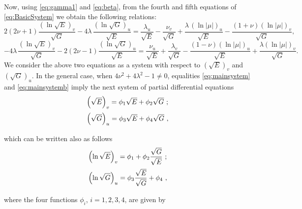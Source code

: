 \documentclass[12pt]{amsart}
\theoremstyle{definition}
\theoremstyle{remark}
\newcommand{\ds}{\displaystyle}
\numberwithin{equation}{section}
\begin{document}
Now, using  \eqref{eq:gamma1} and  \eqref{eq:beta}, from the fourth and fifth equations of \eqref{eq:BasicSystem} we obtain  the following relations:
\begin{equation}\label{eq:mainsystem}
\ds 2(2\nu+1) \frac{(\ln \sqrt{ E})_v}{\sqrt{G}}	-4\lambda\, \frac{(\ln \sqrt{ G})_u}{\sqrt{E}}  =
	\displaystyle{\frac{\lambda_u}{\sqrt{E}}  - \frac{\nu_v}{\sqrt{G}} + \frac{\lambda\, (\ln |\mu|)_u}{\sqrt E}  - \frac{(1+\nu)(\ln |\mu|)_v}{\sqrt G}},
\end{equation}
\begin{equation}\label{eq:mainsystemb}
		\ds	-4\lambda\, \frac{(\ln \sqrt{E})_v}{\sqrt{G}} - 2(2\nu-1) \frac{(\ln \sqrt{G})_u}{\sqrt{E}}  =
		\displaystyle{\frac{\nu_u}{\sqrt{E}} + \frac{\lambda_v}{\sqrt{G}}  - \frac{(1-\nu)(\ln |\mu|)_u}{\sqrt E}  + \frac{\lambda (\ln |\mu|)_v}{\sqrt G}}.
\end{equation}
We consider the above two equations as a system with respect to $(\sqrt E)_v$ and $(\sqrt G)_u$. In the general case, when $4\nu^2+4\lambda^2-1\ne0$, 
equalities  \eqref{eq:mainsystem} and \eqref{eq:mainsystemb} imply the next system of partial differential equations 
\begin{equation*} %
	\begin{array}{l}
		\vspace{2mm}
		\left(\sqrt E\right)_v=\phi_1\sqrt E+\phi_2\sqrt G \ ; \\
		\vspace{2mm}
		\left(\sqrt G\right)_u=\phi_3\sqrt E+\phi_4\sqrt G \ ,
	\end{array}
\end{equation*} 
which can be written also as follows
\begin{equation} \label{eq:3.3-v2}
	\begin{array}{l}
		\vspace{2mm}
		\ds\left(\ln\sqrt E\right)_v=\phi_1+\phi_2\frac{\sqrt G}{\sqrt E} \ ; \\
		\vspace{2mm}
		\ds\left(\ln\sqrt G\right)_u=\phi_3\frac{\sqrt E}{\sqrt G}+\phi_4 \ ,
	\end{array}   
\end{equation} 
where the four functions $\phi_i$, $i=1,2,3,4$, are given by 
\end{document}
